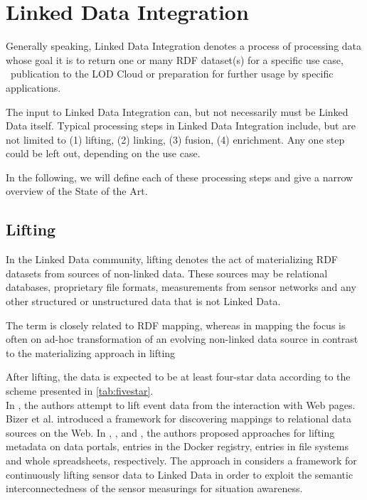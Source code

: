 \section{Linked Data Integration}
\label{sec:ldi}

Generally speaking, Linked Data Integration denotes a process of processing data whose goal it is to return one or many \ac{RDF} dataset(s) for a specific use case, \eg~publication to the \ac{LOD} Cloud or preparation for further usage by specific applications.

The input to Linked Data Integration can, but not necessarily must be Linked Data itself.
Typical processing steps in Linked Data Integration include, but are not limited to (1) lifting, (2) linking, (3) fusion, (4) enrichment.
Any one step could be left out, depending on the use case.

In the following, we will define each of these processing steps and give a narrow overview of the State of the Art.

\subsection{Lifting}
\label{ssec:lifting}
In the Linked Data community, lifting denotes the act of materializing \ac{RDF} datasets from sources of non-linked data.
These sources may be relational databases, proprietary file formats, measurements from sensor networks and any other structured or unstructured data that is not Linked Data.

The term is closely related to \ac{RDF} mapping, whereas in mapping the focus is often on ad-hoc transformation of an evolving non-linked data source in contrast to the materializing approach in lifting

After lifting, the data is expected to be at least four-star data according to the scheme presented in \autoref{tab:fivestar}.\\

In \cite{stuhmer:2009a}, the authors attempt to lift event data from the interaction with Web pages.
Bizer et al.\cite{bizer:2010a} introduced a framework for discovering mappings to relational data sources on the Web.
In \cite{neumaier:2017a}, \cite{ayed:2017a}, \cite{schandl:2010a} and \cite{fiorelli:2015a}, the authors proposed approaches for lifting metadata on data portals, entries in the Docker registry, entries in file systems and whole spreadsheets, respectively.
The approach in \cite{hasan:2011a} considers a framework for continuously lifting sensor data to Linked Data in order to exploit the semantic interconnectedness of the sensor measurings for situation awareness.

